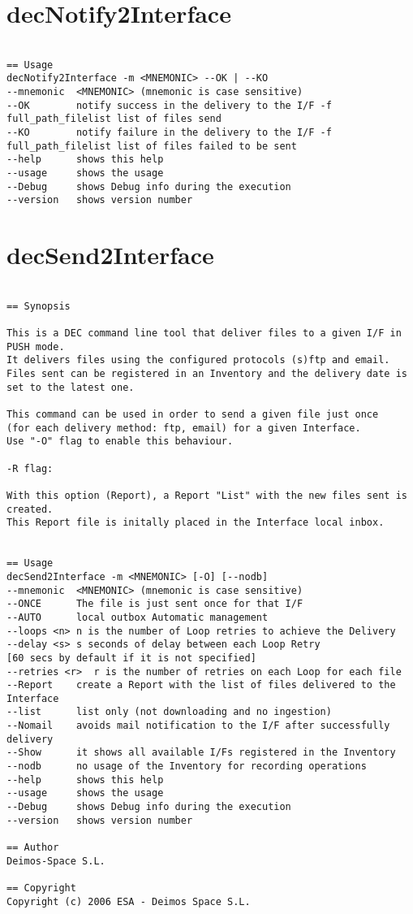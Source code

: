 \documentclass[dec_sum_main.tex]{subfiles}
\begin{document}
\label{decNotify2Interface}
\section{decNotify2Interface}

\begin{verbatim}

== Usage
decNotify2Interface -m <MNEMONIC> --OK | --KO
--mnemonic  <MNEMONIC> (mnemonic is case sensitive)
--OK        notify success in the delivery to the I/F -f full_path_filelist list of files send
--KO        notify failure in the delivery to the I/F -f full_path_filelist list of files failed to be sent
--help      shows this help
--usage     shows the usage
--Debug     shows Debug info during the execution
--version   shows version number

\end{verbatim}

\section{decSend2Interface}

\begin{verbatim}

== Synopsis

This is a DEC command line tool that deliver files to a given I/F in PUSH mode.
It delivers files using the configured protocols (s)ftp and email. 
Files sent can be registered in an Inventory and the delivery date is set to the latest one.

This command can be used in order to send a given file just once 
(for each delivery method: ftp, email) for a given Interface. 
Use "-O" flag to enable this behaviour.

-R flag:

With this option (Report), a Report "List" with the new files sent is created. 
This Report file is initally placed in the Interface local inbox.


== Usage
decSend2Interface -m <MNEMONIC> [-O] [--nodb]
--mnemonic  <MNEMONIC> (mnemonic is case sensitive)
--ONCE      The file is just sent once for that I/F
--AUTO      local outbox Automatic management 
--loops <n> n is the number of Loop retries to achieve the Delivery
--delay <s> s seconds of delay between each Loop Retry
[60 secs by default if it is not specified]
--retries <r>  r is the number of retries on each Loop for each file
--Report    create a Report with the list of files delivered to the Interface
--list      list only (not downloading and no ingestion)
--Nomail    avoids mail notification to the I/F after successfully delivery
--Show      it shows all available I/Fs registered in the Inventory
--nodb      no usage of the Inventory for recording operations
--help      shows this help
--usage     shows the usage
--Debug     shows Debug info during the execution
--version   shows version number

== Author
Deimos-Space S.L.

== Copyright
Copyright (c) 2006 ESA - Deimos Space S.L.


\end{verbatim}
\end{document}
